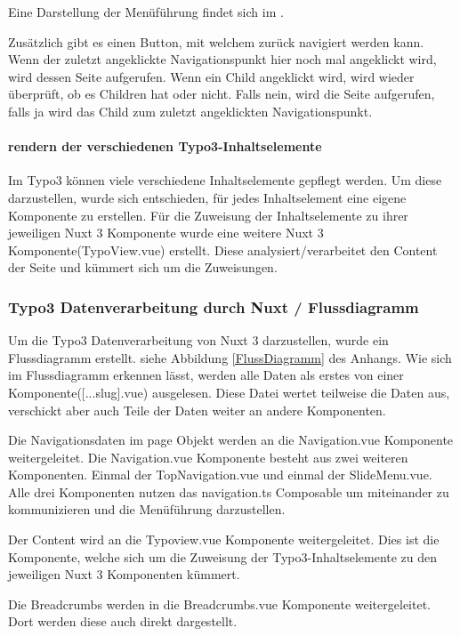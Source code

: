Eine Darstellung der Menüführung findet sich im . 

Zusätzlich gibt es einen Button, mit welchem zurück navigiert werden kann. Wenn der zuletzt angeklickte Navigationspunkt hier noch mal angeklickt wird, wird dessen Seite aufgerufen. Wenn ein Child angeklickt wird, wird wieder überprüft, ob es Children hat oder nicht. Falls nein, wird die Seite aufgerufen, falls ja wird das Child zum zuletzt angeklickten Navigationspunkt. 

\paragraph{rendern der verschiedenen Typo3-Inhaltselemente}
Im Typo3 können viele verschiedene Inhaltselemente gepflegt werden. Um diese darzustellen, wurde sich entschieden, für jedes Inhaltselement eine eigene Komponente zu erstellen. Für die Zuweisung der Inhaltselemente zu ihrer jeweiligen Nuxt 3 Komponente wurde eine weitere Nuxt 3 Komponente(TypoView.vue) erstellt. Diese analysiert/verarbeitet den Content der Seite und kümmert sich um die Zuweisungen.

\subsubsection{Typo3 Datenverarbeitung durch Nuxt / Flussdiagramm}
\label{sec:Typo3 Datenverarbeitung durch Nuxt / Flussdiagramm} 

Um die Typo3 Datenverarbeitung von Nuxt 3 darzustellen, wurde ein Flussdiagramm erstellt. siehe Abbildung \ref{FlussDiagramm} des Anhangs. Wie sich im Flussdiagramm erkennen lässt, werden alle Daten als erstes von einer Komponente([...slug].vue) ausgelesen. Diese Datei wertet teilweise die Daten aus, verschickt aber auch Teile der Daten weiter an andere Komponenten. 

Die Navigationsdaten im page Objekt werden an die Navigation.vue Komponente weitergeleitet. Die Navigation.vue Komponente besteht aus zwei weiteren Komponenten. Einmal der TopNavigation.vue und einmal der SlideMenu.vue. Alle drei Komponenten nutzen das navigation.ts Composable um miteinander zu kommunizieren und die Menüführung darzustellen.

Der Content wird an die Typoview.vue Komponente weitergeleitet. Dies ist die Komponente, welche sich um die Zuweisung der Typo3-Inhaltselemente zu den jeweiligen Nuxt 3 Komponenten kümmert. 

Die Breadcrumbs werden in die Breadcrumbs.vue Komponente weitergeleitet. Dort werden diese auch direkt dargestellt. 


